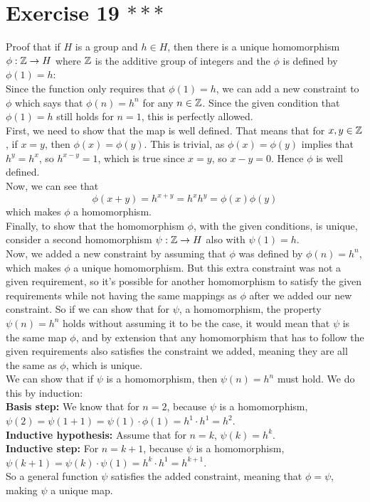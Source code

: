 \documentclass[12pt]{article}
\begin{document}
    \section*{Exercise 19 $***$}
    Proof that if $H$ is a group and $h \in H$,
    then there is a unique homomorphism $\phi: \mathbb{Z} \to H$
    where $\mathbb{Z}$ is the additive group of integers
    and the $\phi$ is defined by $\phi(1) = h$: \\
    Since the function only requires that $\phi(1) = h$,
    we can add a new constraint to $\phi$ which says that 
    $\phi(n) = h^n$ for any $n \in \mathbb{Z}$.
    Since the given condition that $\phi(1) = h$ still holds for $n = 1$,
    this is perfectly allowed. \\
    First, we need to show that the map is well defined.
    That means that for $x, y \in \mathbb{Z}$, if $x = y$,
    then $\phi(x) = \phi(y)$.
    This is trivial,
    as $\phi(x) = \phi(y)$ implies that $h^y = h^x$,
    so $h^{x - y} = 1$,
    which is true since $x = y$,
    so $x - y = 0$.
    Hence $\phi$ is well defined. \\
    Now, we can see that
    \[ \phi(x + y) = h^{x + y}
    = h^xh^y
    = \phi(x)\phi(y) \]
    which makes $\phi$ a homomorphism. \\
    Finally, to show that the homomorphism $\phi$, with the given conditions,
    is unique,
    consider a second homomorphism $\psi: \mathbb{Z} \to H$
    also with $\psi(1) = h$. \\
    Now, we added a new constraint by assuming that $\phi$ was
    defined by $\phi(n) = h^n$,
    which makes $\phi$ a unique homomorphism.
    But this extra constraint was not a given requirement,
    so it's possible for another homomorphism to satisfy
    the given requirements while not having the same mappings as $\phi$
    after we added our new constraint.
    So if we can show that for $\psi$, a homomorphism,
    the property $\psi(n) = h^n$ holds without assuming it to be the case,
    it would mean that $\psi$ is the same map $\phi$,
    and by extension that any homomorphism that has to follow the given
    requirements also satisfies the constraint we added,
    meaning they are all the same as $\phi$, which is unique. \\
    We can show that if $\psi$ is a homomorphism,
    then $\psi(n) = h^n$ must hold.
    We do this by induction: \\
    \textbf{Basis step:}
    We know that for $n = 2$,
    because $\psi$ is a homomorphism,
    $\psi(2) = \psi(1 + 1)
    = \psi(1) \cdot \phi(1) = h^1 \cdot h^1 = h^2$. \\
    \textbf{Inductive hypothesis:}
    Assume that for $n = k$, $\psi(k) = h^k$. \\ 
    \textbf{Inductive step:}
    For $n = k + 1$, because $\psi$ is a homomorphism,
    $\psi(k + 1) = \psi(k) \cdot \psi(1)
    = h^k \cdot h^1 = h^{k+1}$. \\
    So a general function $\psi$ satisfies the added constraint,
    meaning that $\phi = \psi$,
    making $\psi$ a unique map.
\end{document}

